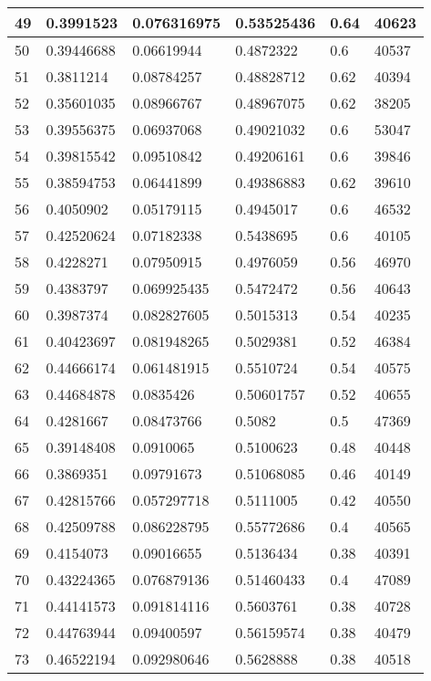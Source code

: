 \begin{longtable}{|l|l|l|l|l|l|}
49 & 0.3991523 & 0.076316975 & 0.53525436 & 0.64 & 40623 \\ \hline 
50 & 0.39446688 & 0.06619944 & 0.4872322 & 0.6 & 40537 \\ \hline 
51 & 0.3811214 & 0.08784257 & 0.48828712 & 0.62 & 40394 \\ \hline 
52 & 0.35601035 & 0.08966767 & 0.48967075 & 0.62 & 38205 \\ \hline 
53 & 0.39556375 & 0.06937068 & 0.49021032 & 0.6 & 53047 \\ \hline 
54 & 0.39815542 & 0.09510842 & 0.49206161 & 0.6 & 39846 \\ \hline 
55 & 0.38594753 & 0.06441899 & 0.49386883 & 0.62 & 39610 \\ \hline 
56 & 0.4050902 & 0.05179115 & 0.4945017 & 0.6 & 46532 \\ \hline 
57 & 0.42520624 & 0.07182338 & 0.5438695 & 0.6 & 40105 \\ \hline 
58 & 0.4228271 & 0.07950915 & 0.4976059 & 0.56 & 46970 \\ \hline 
59 & 0.4383797 & 0.069925435 & 0.5472472 & 0.56 & 40643 \\ \hline 
60 & 0.3987374 & 0.082827605 & 0.5015313 & 0.54 & 40235 \\ \hline 
61 & 0.40423697 & 0.081948265 & 0.5029381 & 0.52 & 46384 \\ \hline 
62 & 0.44666174 & 0.061481915 & 0.5510724 & 0.54 & 40575 \\ \hline 
63 & 0.44684878 & 0.0835426 & 0.50601757 & 0.52 & 40655 \\ \hline 
64 & 0.4281667 & 0.08473766 & 0.5082 & 0.5 & 47369 \\ \hline 
65 & 0.39148408 & 0.0910065 & 0.5100623 & 0.48 & 40448 \\ \hline 
66 & 0.3869351 & 0.09791673 & 0.51068085 & 0.46 & 40149 \\ \hline 
67 & 0.42815766 & 0.057297718 & 0.5111005 & 0.42 & 40550 \\ \hline 
68 & 0.42509788 & 0.086228795 & 0.55772686 & 0.4 & 40565 \\ \hline 
69 & 0.4154073 & 0.09016655 & 0.5136434 & 0.38 & 40391 \\ \hline 
70 & 0.43224365 & 0.076879136 & 0.51460433 & 0.4 & 47089 \\ \hline 
71 & 0.44141573 & 0.091814116 & 0.5603761 & 0.38 & 40728 \\ \hline 
72 & 0.44763944 & 0.09400597 & 0.56159574 & 0.38 & 40479 \\ \hline 
73 & 0.46522194 & 0.092980646 & 0.5628888 & 0.38 & 40518 \\ \hline 

\end{longtable}
